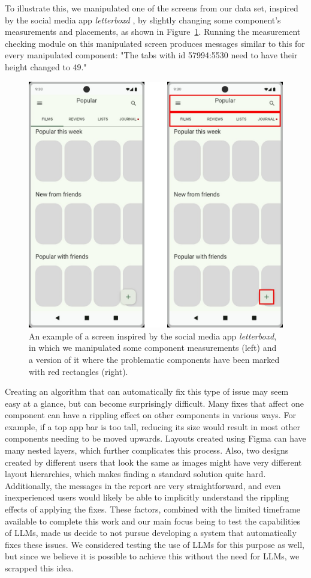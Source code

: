 \documentclass[11pt,titlepage,oneside,openany]{book}
\begin{document}
To illustrate this, we manipulated one of the screens from our data set, inspired by the social media app \emph{letterboxd} \cite{noauthor_letterboxd_nodate}, by slightly changing some component's measurements and placements, as shown in Figure~\ref{fig:measurements_ex}. Running the measurement checking module on this manipulated screen produces messages similar to this for every manipulated component: "The tabs with id 57994:5530 need to have their height changed to 49." \pagebreak

\begin{figure}[t]
	\centering
	\includegraphics[width=.6\textwidth]{figures/wrong_measurements_ex.png}
	\caption{An example of a screen inspired by the social media app \emph{letterboxd}, in which we manipulated some component measurements (left) and a version of it where the problematic components have been marked with red rectangles (right).}
	\label{fig:measurements_ex}
\end{figure}

Creating an algorithm that can automatically fix this type of issue may seem easy at a glance, but can become surprisingly difficult. Many fixes that affect one component can have a rippling effect on other components in various ways. For example, if a top app bar is too tall, reducing its size would result in most other components needing to be moved upwards. Layouts created using Figma can have many nested layers, which further complicates this process. Also, two designs created by different users that look the same as images might have very different layout hierarchies, which makes finding a standard solution quite hard. Additionally, the messages in the report are very straightforward, and even inexperienced users would likely be able to implicitly understand the rippling effects of applying the fixes. These factors, combined with the limited timeframe available to complete this work and our main focus being to test the capabilities of LLMs, made us decide to not pursue developing a system that automatically fixes these issues. We considered testing the use of LLMs for this purpose as well, but since we believe it is possible to achieve this without the need for LLMs, we scrapped this idea.
\end{document}
